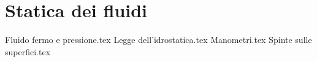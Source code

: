 %
\chapter{Statica dei fluidi}
%
{Fluido fermo e pressione.tex}
{Legge dell'idrostatica.tex}
{Manometri.tex}
{Spinte sulle superfici.tex}